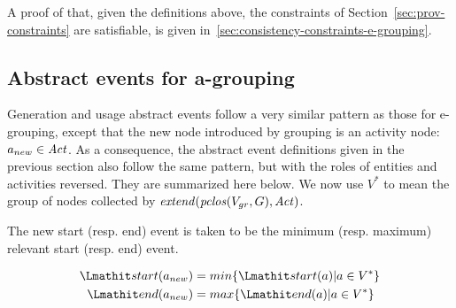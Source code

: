 A proof of that, given the definitions above, the  constraints of Section~\ref{sec:prov-constraints} are satisfiable, is given in~\ref{sec:consistency-constraints-e-grouping}.


\subsection{Abstract events for a-grouping}
\label{sec:abstract-events-for-a-grouping}

Generation and usage abstract events follow a very similar pattern as those for e-grouping, except that the new node introduced by grouping is an activity node: $a_{new} \in \mathit{Act}$.
%
As a consequence, the abstract event definitions given in the previous section also follow the same pattern, but with the roles of entities and activities reversed. They are summarized here below.  We now use $V^*$ to mean the group of nodes collected by $\mathit{extend}(\mathit{pclos}(V_{gr},G), \mathit{Act})$.

%
%
%
%

The new start (resp. end) event is taken to be the minimum (resp. maximum) relevant start (resp. end)  event.
\begin{definition} 
\label{def:abstract-start-and-end-a}
\begin{align*}
  \start(a_{new}) & = min\{\start(a) | a \in V^*\} \\
  \ed(a_{new}) & = max\{\ed(a) | a \in V^*\} \\
\end{align*}
\end{definition}

